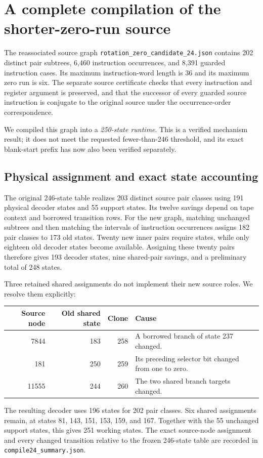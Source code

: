 \section{A complete compilation of the shorter-zero-run source}
The reassociated source graph \texttt{rotation\_zero\_candidate\_24.json}
contains 202 distinct pair subtrees, 6,460 instruction occurrences, and 8,391
guarded instruction cases. Its maximum instruction-word length is 36 and
its maximum zero run is six. The separate source certificate checks that
every instruction and register argument is preserved, and that the successor
of every guarded source instruction is conjugate to the original source
under the occurrence-order correspondence.

We compiled this graph into a \emph{250-state runtime}. This is a verified
mechanism result; it does not meet the requested fewer-than-246 threshold,
and its exact blank-start prefix has now also been verified separately.

\subsection{Physical assignment and exact state accounting}
The original 246-state table realizes 203 distinct source pair classes using
191 physical decoder states and 55 support states. Its twelve savings depend
on tape context and borrowed transition rows. For the new graph, matching
unchanged subtrees and then matching the intervals of instruction occurrences
assigns 182 pair classes to 173 old states. Twenty new inner pairs require
states, while only eighteen old decoder states become available. Assigning
these twenty pairs therefore gives 193 decoder states, nine shared-pair
savings, and a preliminary total of 248 states.

Three retained shared assignments do not implement their new source roles.
We resolve them explicitly:
\begin{center}
\begin{tabular}{r r r l}
Source node & Old shared state & Clone & Cause\\\hline
7844 & 183 & 258 & A borrowed branch of state 237 changed.\\
181 & 250 & 259 & Its preceding selector bit changed from one to zero.\\
11555 & 244 & 260 & The two shared branch targets changed.\\
\end{tabular}
\end{center}
The resulting decoder uses 196 states for 202 pair classes. Six shared
assignments remain, at states 81, 143, 151, 153, 159, and 167. Together with
the 55 unchanged support states, this gives 251 working states.
The exact source-node assignment and every changed transition relative to
the frozen 246-state table are recorded in \texttt{compile24\_summary.json}.

